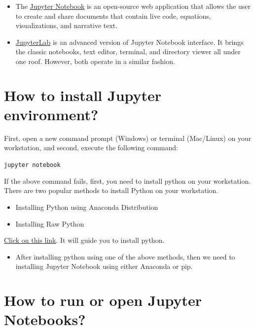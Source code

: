 \documentclass[
]{book}
\providecommand{\tightlist}{%
  \setlength{\itemsep}{0pt}\setlength{\parskip}{0pt}}
\begin{document}
\begin{itemize}
\tightlist
\item
  The \href{https://jupyter.org/}{Jupyter Notebook} is an open-source web application that allows the user to create and share documents that contain live code, equations, visualizations, and narrative text.
\item
  \href{https://jupyter.org/}{JupyterLab} is an advanced version of Jupyter Notebook interface. It brings the classic notebooks, text editor, terminal, and directory viewer all under one roof. However, both operate in a similar fashion.
\end{itemize}

\hypertarget{how-to-install-jupyter-environment}{%
\section{How to install Jupyter environment?}\label{how-to-install-jupyter-environment}}

First, open a new command prompt (Windows) or terminal (Mac/Linux) on your workstation, and second, execute the following command:

\texttt{jupyter\ notebook}

If the above command fails, first, you need to install python on your workstation. There are two popular methods to install Python on your workstation.

\begin{itemize}
\tightlist
\item
  Installing Python using Anaconda Distribution
\item
  Installing Raw Python
\end{itemize}

\href{https://blog.quantinsti.com/jupyter-notebook-tutorial-installation-components-magic-commands/?source=google\&medium=cpc\&campaign=dsa_other_topnations\&gclid=CjwKCAjw_L6LBhBbEiwA4c46ui3I3LExNsT-8hio3gGLkVRXewJwHZO3EijzgRAkh29lx7uCg8P4hxoCGuAQAvD_BwE}{Click on this link}. It will guide you to install python.

\begin{itemize}
\tightlist
\item
  After installing python using one of the above methods, then we need to installing Jupyter Notebook using either Anaconda or pip.
\end{itemize}

\hypertarget{how-to-run-or-open-jupyter-notebooks}{%
\section{How to run or open Jupyter Notebooks?}\label{how-to-run-or-open-jupyter-notebooks}}
\end{document}
